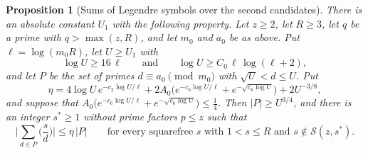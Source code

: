 \documentclass[11pt,letterpaper]{article}
\newtheorem{proposition}[theorem]{Proposition}
\numberwithin{equation}{section}
\begin{document}
\begin{proposition}[Sums of Legendre symbols over the second candidates]\label{legendre2}
There is an absolute constant $U_1$ with the following property. Let $z\ge2$, let $R\ge3$, let $q$ be a prime with $q>\max(z,R)$, and let $m_0$ and $a_0$ be as above. Put $\ell=\log(m_0R)$, let $U\ge U_1$ with
\[
\log U\ge16\,\ell\qquad\text{and}\qquad\log U\ge C_0\,\ell\,\log(\ell+2),
\]
and let $P$ be the set of primes $d\equiv a_0\pmod{m_0}$ with $\sqrt U<d\le U$. Put
\[
\eta=4\log U\,e^{-c_2\log U/\ell}+2A_0\Big(e^{-c_6\log U/\ell}+e^{-\sqrt{c_6\log U}}\Big)+2U^{-3/8},
\]
and suppose that $A_0\big(e^{-c_6\log U/\ell}+e^{-\sqrt{c_6\log U}}\big)\le\tfrac14$. Then $|P|\ge U^{3/4}$, and there is an integer $s^\ast\ge1$ without prime factors $p\le z$ such that
\[
\Big|\sum_{d\in P}\Big(\frac sd\Big)\Big|\le\eta\,|P|\qquad\text{for every squarefree }s\text{ with }1<s\le R\text{ and }s\notin\mathcal S(z,s^\ast).
\]
\end{proposition}
\end{document}
